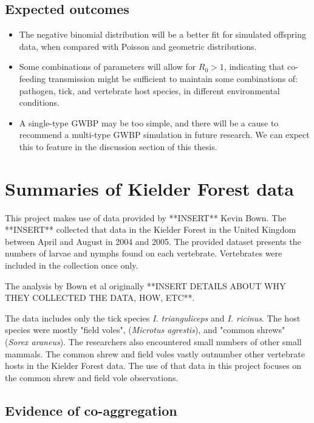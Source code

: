 \documentclass{article}
\begin{document}
\subsection{Expected outcomes}

\begin{itemize}
  \item The negative binomial distribution will be a better fit for simulated offspring data, when compared with Poisson and geometric distributions.
  \item Some combinations of parameters will allow for $ R_0 > 1 $, indicating that co-feeding transmission might be sufficient to maintain some combinations of: pathogen, tick, and vertebrate host species, in different environmental conditions.
  \item A single-type GWBP may be too simple, and there will be a cause to recommend a multi-type GWBP simulation in future research. We can expect this to feature in the discussion section of this thesis.
\end{itemize}

\newpage

\section{Summaries of Kielder Forest data}

This project makes use of data provided by **INSERT** Kevin Bown. The **INSERT** collected that data in the Kielder Forest in the United Kingdom between April and August in 2004 and 2005. The provided dataset presents the numbers of larvae and nymphs found on each vertebrate. Vertebrates were included in the collection once only.

The analysis by Bown et al originally **INSERT DETAILS ABOUT WHY THEY COLLECTED THE DATA, HOW, ETC**.

The data includes only the tick species \textit{I. trianguliceps} and  \textit{I. ricinus}. The host species were mostly "field voles", (\textit{Microtus agrestis}), and "common shrews" (\textit{Sorex araneus}). The researchers also encountered small numbers of other small mammals. The common shrew and field voles vastly outnumber other vertebrate hosts in the Kielder Forest data. The use of that data in this project focuses on the common shrew and field vole observations. 

\subsection{Evidence of co-aggregation}
\end{document}
